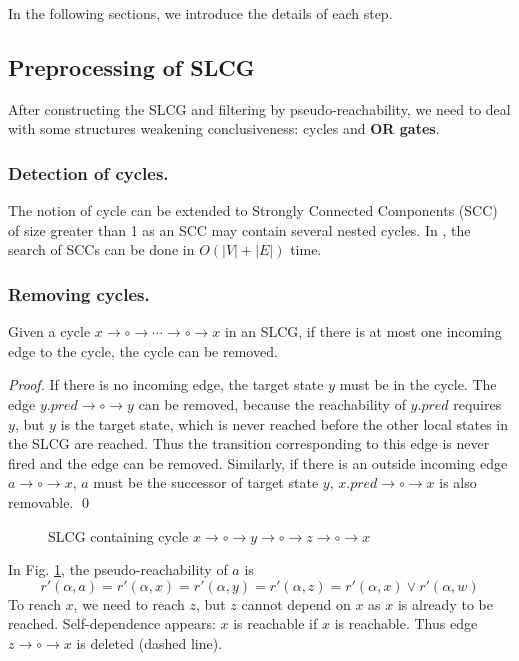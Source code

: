 \documentclass[runningheads]{llncs}
\begin{document}
In the following sections, we introduce the details of each step.

\subsection{Preprocessing of SLCG}\label{sectprecond}
After constructing the SLCG and filtering by pseudo-reachability, we need to deal with some structures weakening conclusiveness: cycles and \textbf{OR gates}.
\subsubsection{Detection of cycles.}
The notion of cycle can be extended to Strongly Connected Components (SCC) of size greater than 1 as an SCC may contain several nested cycles. 
In \cite{tarjan1972}, the search of SCCs can be done in $O(|V|+|E|)$ time. 

\subsubsection{Removing cycles.}
\begin{theorem}\label{th:break_cycle}
Given a cycle $x\to \circ \to \cdots \to \circ \to x$ in an SLCG, if there is at most one incoming edge to the cycle, the cycle can be removed.
\end{theorem}
\begin{proof}
If there is no incoming edge, the target state $y$ must be in the cycle. 
The edge $y.pred\to\circ\to y$ can be removed, because the reachability of $y.pred$ requires $y$, but $y$ is the target state, which is never reached before the other local states in the SLCG are reached.
Thus the transition corresponding to this edge is never fired and the edge can be removed.
Similarly, if there is an outside incoming edge $a\to \circ \to x$, $a$ must be the successor of target state $y$, $x.pred\to\circ\to x$ is also removable.
\qed
\end{proof}


\begin{example}
    \begin{figure}[H]
        \centering
        
        \caption{SLCG containing cycle $x\to \circ \to y \to \circ \to z\to \circ \to x$}
        \label{cycle1}
    \end{figure}
    
    In Fig. \ref{cycle1}, the pseudo-reachability of $a$ is 
    $$r'(\alpha,a)=r'(\alpha,x)=r'(\alpha,y)=r'(\alpha,z)=r'(\alpha,x)\lor r'(\alpha,w)$$
    To reach $x$, we need to reach $z$, but $z$ cannot depend on $x$ as $x$ is already to be reached. 
    Self-dependence appears: $x$ is reachable if $x$ is reachable.
    Thus edge $z\to \circ \to x$ is deleted (dashed line).
\end{example}
\end{document}
